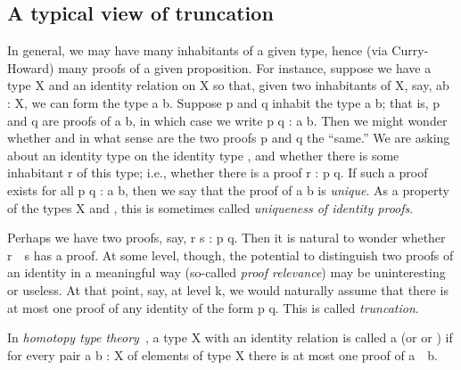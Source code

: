 \documentclass[a4paper,UKenglish,cleveref,autoref,thm-restate,11pt]{lipics-v2021}
\begin{document}
\subsection{A typical view of truncation}\label{sec:standard-type-truncation}
In general, we may have many inhabitants of a given type, hence (via Curry-Howard) many proofs of a given proposition. For instance, suppose we have a type \ab X and an identity relation  on \ab X so that, given two inhabitants of \ab X, say, \ab a\AgdaSpace{}\ab b \as : \ab X, we can form the type \ab a  \ab b. Suppose \ab p and \ab q inhabit the type \ab a  \ab b; that is, \ab p and \ab q are proofs of \ab a  \ab b, in which case we write \ab p \ab q : \ab a  \ab b. Then we might wonder whether and in what sense are the two proofs \ab p and \ab q the ``same.'' We are asking about an identity type on the identity type , and whether there is some inhabitant \ab r of this type; i.e., whether there is a proof \ab r : \ab p  \ab q.  If such a proof exists for all \ab p \ab q : \ab a  \ab b, then we say that the proof of \ab a  \ab b is \emph{unique}. As a property of the types \ab X and , this is sometimes called \emph{uniqueness of identity proofs}.

Perhaps we have two proofs, say, \ab r \ab s : \ab p  \ab q. Then it is natural to wonder whether \ab r~~\ab s has a proof.  At some level, though, the potential to distinguish two proofs of an identity in a meaningful way (so-called \emph{proof relevance}) may be uninteresting or useless. At that point, say, at level \ab k, we would naturally assume that there is at most one proof of any identity of the form \ab p   \ab q. This is called \emph{truncation}.

In \emph{homotopy type theory}~\cite{HoTT:2013}, a type \ab X with an identity relation  is called a  (or  or ) if for every pair \ab a \ab b \as : \ab X of elements of type \ab X there is at most one proof of \ab a~~\ab b.

\end{document}
